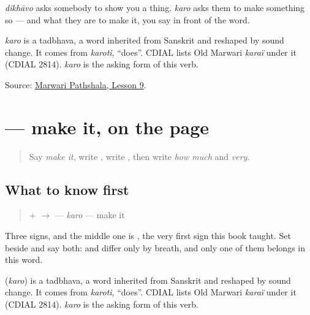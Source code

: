 \emph{dikhāvo} asks somebody to show you a thing. \emph{karo} asks them to make something so — and what they are to make it, you say in front of the word.

\begin{cousinweb}
\emph{karo} is a tadbhava, a word inherited from Sanskrit and reshaped by sound change. It comes from \emph{karoti}, \textquotedblleft{}does\textquotedblright{}. CDIAL lists Old Marwari \emph{karaï} under it (CDIAL 2814). \emph{karo} is the asking form of this verb.
\end{cousinweb}

\begin{tcolorbox}[breakable,colback=teal!4,colframe=teal!35!black,title={Before you move on}]
Source: \href{https://www.marwaripathshala.com/marwari-lesson-9-english}{Marwari Pathshala, Lesson 9}.
\end{tcolorbox}
\section[\texorpdfstring{\mw{करो} (karo)}{करो (karo)}]{ — make it, on the page}

\label{lesson:MW-C23-karo}



\begin{quote}
Say \emph{make it}, write \textbf{}, write \textbf{}, then write \emph{how much} and \emph{very}.
\end{quote}

\subsection*{What to know first}
\begin{quote}
\textbf{} + \textbf{} $\to$ \textbf{} — \emph{karo} — make it
\end{quote}

Three signs, and the middle one is \textbf{}, the very first sign this book taught. Set \textbf{} beside \textbf{} and say both: \textbf{} and \textbf{} differ only by breath, and only one of them belongs in this word.

\begin{cousinweb}
\textbf{} (\emph{karo}) is a tadbhava, a word inherited from Sanskrit and reshaped by sound change. It comes from \emph{karoti}, \textquotedblleft{}does\textquotedblright{}. CDIAL lists Old Marwari \emph{karaï} under it (CDIAL 2814). \emph{karo} is the asking form of this verb.
\end{cousinweb}

